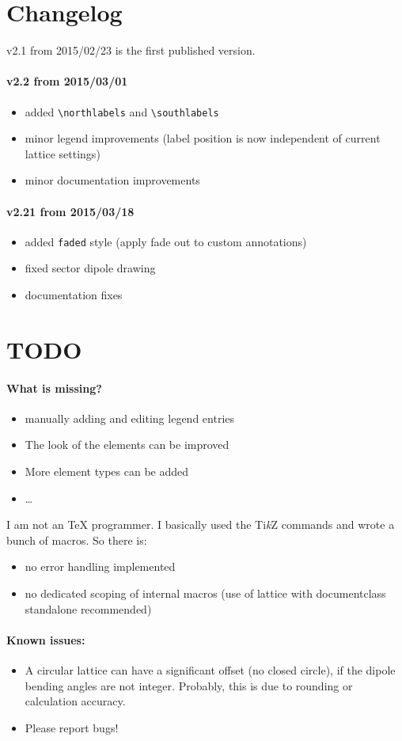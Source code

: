 \documentclass[a4paper]{scrartcl}
\newcommand{\tikzlabel}{Ti\textit{k}Z}
\begin{document}
\clearpage
\section{Changelog}
\label{sec:changelog}
v2.1 from 2015/02/23 is the first published version.

\paragraph{v2.2 from 2015/03/01}
\begin{itemize}
\item added \lstinline+\northlabels+ and \lstinline+\southlabels+
\item minor legend improvements (label position is now independent of current lattice settings)
\item minor documentation improvements
\end{itemize}

\paragraph{v2.21 from 2015/03/18}
\begin{itemize}
\item added \lstinline+faded+ style (apply fade out to custom annotations)
\item fixed sector dipole drawing
\item documentation fixes
\end{itemize}


\section{TODO}
\label{sec:todo}

\paragraph{What is missing?}
\begin{itemize}
\item manually adding and editing legend entries
\item The look of the elements can be improved
\item More element types can be added
\item \ldots{}
\end{itemize}

I am not an \TeX{} programmer. I basically used the \tikzlabel{} commands and wrote a
bunch of macros. So there is:
\begin{itemize}
\item no error handling implemented
\item no dedicated scoping of internal macros (use of lattice with documentclass standalone recommended)
\end{itemize}

\paragraph{Known issues:}
\begin{itemize}
\item A circular lattice can have a significant offset (no closed circle), if the dipole
  bending angles are not integer. Probably, this is due to rounding or calculation
  accuracy.
\item Please report bugs!
\end{itemize}
\end{document}
